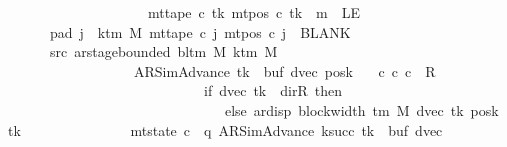 \begin{isabellebody}
\ \ \ \ \ \ \ \ \ \ \ \ \ \ \ \ \ \ \ \ {\isasymLongrightarrow}\ mt{\isacharunderscore}{\kern0pt}tape\ c{}\ tk\ {\isacharparenleft}{\kern0pt}mt{\isacharunderscore}{\kern0pt}pos\ c{}\ tk\ {\isacharminus}{\kern0pt}\ m{\isacharparenright}{\kern0pt}\ {\isasymnoteq}\ LE{}{\isachardoublequoteclose}\isanewline
\ \ \ \ \ \ \ pad{}{\isacharcolon}{\kern0pt}\ {\isachardoublequoteopen}{\isasymforall}j\ {\isasymge}\ k{\isacharunderscore}{\kern0pt}tm\ M{\isachardot}{\kern0pt}\ mt{\isacharunderscore}{\kern0pt}tape\ c{}\ j\ {\isacharparenleft}{\kern0pt}mt{\isacharunderscore}{\kern0pt}pos\ c{}\ j{\isacharparenright}{\kern0pt}\ {\isacharequal}{\kern0pt}\ BLANK{}{\isachardoublequoteclose}\isanewline
\ \ \ \ \ \ \ src{}{\isacharcolon}{\kern0pt}\ {\isachardoublequoteopen}ar{\isacharunderscore}{\kern0pt}stage{\isacharunderscore}{\kern0pt}bounded\ {\isacharparenleft}{\kern0pt}bl{\isacharunderscore}{\kern0pt}tm\ M{\isacharparenright}{\kern0pt}\ {\isacharparenleft}{\kern0pt}k{\isacharunderscore}{\kern0pt}tm\ M{\isacharparenright}{\kern0pt}\isanewline
\ \ \ \ \ \ \ \ \ \ \ \ \ \ \ \ \ \ \ {\isacharparenleft}{\kern0pt}AR{\isacharunderscore}{\kern0pt}SimAdvance{\isacharcomma}{\kern0pt}\ tk{\isacharcomma}{\kern0pt}\ {}{\isacharcomma}{\kern0pt}\ buf{\isacharcomma}{\kern0pt}\ dvec{\isacharcomma}{\kern0pt}\ posk{\isacharparenright}{\kern0pt}{\isachardoublequoteclose}\isanewline
\ \ \ {\isachardoublequoteopen}{\isasymexists}c{\isacharprime}{\kern0pt}{\isachardot}{\kern0pt}\ {\isacharparenleft}{\kern0pt}c{}{\isacharcomma}{\kern0pt}\ c{\isacharprime}{\kern0pt}{\isacharparenright}{\kern0pt}\ {\isasymin}\ R{\isacharprime}{\kern0pt}\isanewline
\ \ \ \ \ \ \ \ \ \ \ \ \ \ \ \ \ \ \ \ \ \ \ \ \ \ \ \ {\isacharcircum}{\kern0pt}{\isacharcircum}{\kern0pt}\ {\isacharparenleft}{\kern0pt}if\ dvec\ tk\ {\isacharequal}{\kern0pt}\ dir{\isachardot}{\kern0pt}R\ then\ {}\isanewline
\ \ \ \ \ \ \ \ \ \ \ \ \ \ \ \ \ \ \ \ \ \ \ \ \ \ \ \ \ \ \ \ else\ ar{\isacharunderscore}{\kern0pt}disp\ {\isacharparenleft}{\kern0pt}block{\isacharunderscore}{\kern0pt}width\ {\isacharparenleft}{\kern0pt}{\isasymGamma}{\isacharunderscore}{\kern0pt}tm\ M{\isacharparenright}{\kern0pt}{\isacharparenright}{\kern0pt}\ {\isacharparenleft}{\kern0pt}dvec\ tk{\isacharparenright}{\kern0pt}\ {\isacharparenleft}{\kern0pt}posk\ tk{\isacharparenright}{\kern0pt}{\isacharparenright}{\kern0pt}\isanewline
\ \ \ \ \ \ \ \ \ \ \ \ \ \ {\isasymand}\ mt{\isacharunderscore}{\kern0pt}state\ c{\isacharprime}{\kern0pt}\ {\isacharequal}{\kern0pt}\ {\isacharparenleft}{\kern0pt}q{\isacharcomma}{\kern0pt}\ AR{\isacharunderscore}{\kern0pt}SimAdvance{\isacharcomma}{\kern0pt}\ k{\isacharunderscore}{\kern0pt}succ\ tk{\isacharcomma}{\kern0pt}\ {}{\isacharcomma}{\kern0pt}\ buf{\isacharcomma}{\kern0pt}\ dvec{\isacharcomma}{\kern0pt}\isanewline

\end{isabellebody}
